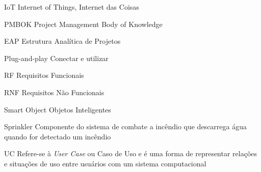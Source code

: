\begin{siglas}
  \item[IoT] Internet of Things, Internet das Coisas
  \item[PMBOK] Project Management Body of Knowledge
  \item[EAP] Estrutura Analítica de Projetos
  \item[Plug-and-play] Conectar e utilizar
  \item[RF] Requisitos Funcionais
  \item[RNF] Requisitos Não Funcionais
  \item[Smart Object] Objetos Inteligentes
  \item[Sprinkler] Componente do sistema de combate a incêndio que descarrega água quando for detectado um incêndio
  \item[UC] Refere-se à \textit{User Case} ou Caso de Uso e é uma forma de representar relações e situações de uso entre usuários com um sistema computacional
\end{siglas}
